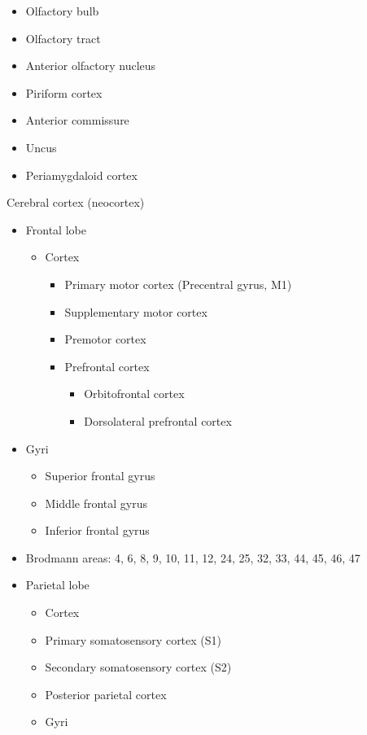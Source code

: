 \begin{itemize}
\tightlist
\item
  Olfactory bulb
\item
  Olfactory tract
\item
  Anterior olfactory nucleus
\item
  Piriform cortex
\item
  Anterior commissure
\item
  Uncus
\item
  Periamygdaloid cortex
\end{itemize}

Cerebral cortex (neocortex)

\begin{itemize}
\tightlist
\item
  Frontal lobe

  \begin{itemize}
  \tightlist
  \item
    Cortex

    \begin{itemize}
    \tightlist
    \item
      Primary motor cortex (Precentral gyrus, M1)
    \item
      Supplementary motor cortex
    \item
      Premotor cortex
    \item
      Prefrontal cortex

      \begin{itemize}
      \tightlist
      \item
        Orbitofrontal cortex
      \item
        Dorsolateral prefrontal cortex
      \end{itemize}
    \end{itemize}
  \end{itemize}
\item
  Gyri

  \begin{itemize}
  \tightlist
  \item
    Superior frontal gyrus
  \item
    Middle frontal gyrus
  \item
    Inferior frontal gyrus
  \end{itemize}
\item
  Brodmann areas: 4, 6, 8, 9, 10, 11, 12, 24, 25, 32, 33, 44, 45, 46, 47
\item
  Parietal lobe

  \begin{itemize}
  \tightlist
  \item
    Cortex
  \item
    Primary somatosensory cortex (S1)
  \item
    Secondary somatosensory cortex (S2)
  \item
    Posterior parietal cortex
  \item
    Gyri


\end{itemize}
\end{itemize}
